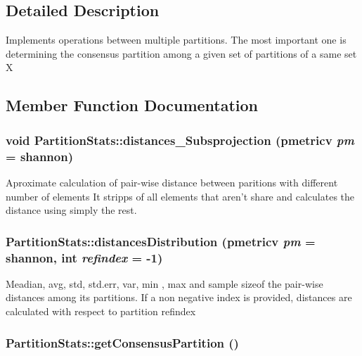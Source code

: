 \subsection{Detailed Description}
Implements operations between multiple partitions. The most important one is determining the consensus partition among a given set of partitions of a same set X 



\subsection{Member Function Documentation}
\subsubsection{\setlength{\rightskip}{0pt plus 5cm}void Partition\-Stats::distances\_\-Subsprojection (pmetricv {\em pm} = shannon)}\label{classPartitionStats_a42}


Aproximate calculation of pair-wise distance between paritions with different number of elements It stripps of all elements that aren't share and calculates the distance using simply the rest. 
\subsubsection{ Partition\-Stats::distances\-Distribution (pmetricv {\em pm} = shannon, int {\em refindex} = -1)}\label{classPartitionStats_a41}


Meadian, avg, std, std.err, var, min , max and sample sizeof the pair-wise distances among its partitions. If a non negative index is provided, distances are calculated with respect to partition refindex
\subsubsection{ Partition\-Stats::get\-Consensus\-Partition ()}\label{classPartitionStats_a12}


